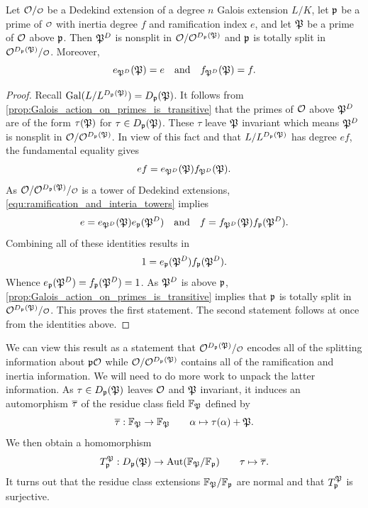     \begin{proposition}\label{prop:decomposition_field_e_and_f}
      Let \(\mc{O}/\smc{O}\) be a Dedekind extension of a degree \(n\) Galois extension \(L/K\), let \(\mathfrak{p}\) be a prime of \(\smc{O}\) with inertia degree \(f\) and ramification index \(e\), and let \(\mathfrak{P}\) be a prime of \(\mathcal{O}\) above \(\mathfrak{p}\). Then \(\mathfrak{P}^{D}\) is nonsplit in \(\mathcal{O}/\mathcal{O}^{D_{\mathfrak{p}}(\mathfrak{P})}\) and \(\mathfrak{p}\) is totally split in \(\mc{O}^{D_{\mf{p}}(\mf{P})}/\smc{O}\). Moreover,
      \[
        e_{\mathfrak{P}^{D}}(\mathfrak{P}) = e \quad \text{and} \quad f_{\mathfrak{P}^{D}}(\mathfrak{P}) = f.
      \]
    \end{proposition}
    \begin{proof}
      Recall \(\operatorname{\mathrm{Gal}}(L/L^{D_{\mathfrak{p}}(\mathfrak{P})}) = D_{\mathfrak{p}}(\mathfrak{P})\). It follows from \cref{prop:Galois_action_on_primes_is_transitive} that the primes of \(\mathcal{O}\) above \(\mathfrak{P}^{D}\) are of the form \(\tau(\mathfrak{P})\) for \(\tau \in D_{\mathfrak{p}}(\mathfrak{P})\). These \(\tau\) leave \(\mathfrak{P}\) invariant which means \(\mathfrak{P}^{D}\) is nonsplit in \(\mathcal{O}/\mathcal{O}^{D_{\mathfrak{p}}(\mathfrak{P})}\). In view of this fact and that \(L/L^{D_{\mathfrak{p}}(\mathfrak{P})}\) has degree \(ef\), the fundamental equality gives
      \[
        ef = e_{\mathfrak{P}^{D}}(\mathfrak{P})f_{\mathfrak{P}^{D}}(\mathfrak{P}).
      \]
      As \(\mc{O}/\mc{O}^{D_{\mf{p}}(\mf{P})}/\smc{O}\) is a tower of Dedekind extensions, \cref{equ:ramification_and_interia_towers} implies
      \[
        e = e_{\mathfrak{P}^{D}}(\mathfrak{P})e_{\mathfrak{p}}(\mathfrak{P}^{D}) \quad \text{and} \quad f = f_{\mathfrak{P}^{D}}(\mathfrak{P})f_{\mathfrak{p}}(\mathfrak{P}^{D}).
      \]
      Combining all of these identities results in
      \[
        1 = e_{\mathfrak{p}}(\mathfrak{P}^{D})f_{\mathfrak{p}}(\mathfrak{P}^{D}).
      \]
      Whence \(e_{\mathfrak{p}}(\mathfrak{P}^{D}) = f_{\mathfrak{p}}(\mathfrak{P}^{D}) = 1\). As \(\mathfrak{P}^{D}\) is above \(\mathfrak{p}\), \cref{prop:Galois_action_on_primes_is_transitive} implies that \(\mathfrak{p}\) is totally split in \(\mc{O}^{D_{\mf{p}}(\mf{P})}/\smc{O}\). This proves the first statement. The second statement follows at once from the identities above.
    \end{proof}
    
    We can view this result as a statement that \(\mc{O}^{D_{\mf{p}}(\mf{P})}/\smc{O}\) encodes all of the splitting information about \(\mathfrak{p}\mathcal{O}\) while \(\mathcal{O}/\mathcal{O}^{D_{\mathfrak{p}}(\mathfrak{P})}\) contains all of the ramification and inertia information. We will need to do more work to unpack the latter information. As \(\tau \in D_{\mathfrak{p}}(\mathfrak{P})\) leaves \(\mathcal{O}\) and \(\mathfrak{P}\) invariant, it induces an automorphism \(\overline{\tau}\) of the residue class field \(\mathbb{F}_{\mathfrak{P}}\) defined by
    \[
      \overline{\tau}:\mathbb{F}_{\mathfrak{P}}\to \mathbb{F}_{\mathfrak{P}}\qquad \alpha \mapsto \tau(\alpha)+\mathfrak{P}.
    \]
    We then obtain a homomorphism
    \[
      T_{\mathfrak{p}}^{\mathfrak{P}}:D_{\mathfrak{p}}(\mathfrak{P}) \to \operatorname{\mathrm{Aut}}(\mathbb{F}_{\mathfrak{P}}/\mathbb{F}_{\mathfrak{p}}) \qquad \tau \mapsto \overline{\tau}.
    \]
    It turns out that the residue class extensions \(\mathbb{F}_{\mathfrak{P}}/\mathbb{F}_{\mathfrak{p}}\) are normal and that \(T_{\mathfrak{p}}^{\mathfrak{P}}\) is surjective.
    
